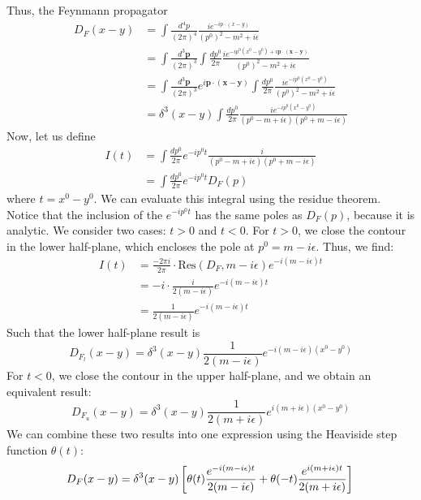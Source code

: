 \documentclass[12pt]{article}
\newcommand{\+}{\dagger}
\begin{document}
Thus, the Feynmann propagator
\begin{align*}
    D_F(x-y) &= \int \frac{d^4p}{(2\pi)^4} \frac{i e^{-ip\cdot(x-y)}}{(p^0)^2 - m^2
    + i\epsilon} \\
    &= \int \frac{d^3\mathbf{p}}{(2\pi)^3} \int \frac{dp^0}{2\pi} \frac{i
    e^{-ip^0(x^0 - y^0) + i\mathbf{p}\cdot(\mathbf{x}-\mathbf{y})}}{(p^0)^2 - m^2
    + i\epsilon} \\
    &= \int \frac{d^3\mathbf{p}}{(2\pi)^3}e^{i\mathbf{p}\cdot (\mathbf{x} - \mathbf{y})} \int \frac{dp^0}{2\pi} \frac{i
    e^{-ip^0(x^0 - y^0)}}{(p^0)^2 - m^2 + i\epsilon} \\
    &= \delta^3(x - y) \int \frac{dp^0}{2\pi} \frac{i
    e^{-ip^0(x^0 - y^0)}}{(p^0  - m + i\epsilon)(p^0 + m - i\epsilon)}
\end{align*}
Now, let us define 
\begin{align*}
    I(t) &= \int \frac{dp^0}{2\pi}e^{-ip^0 t} \frac{i}{(p^0  - m +
    i\epsilon)(p^0 + m - i\epsilon)}  \\
    &= \int \frac{dp^0}{2\pi} e^{-ip^0 t} D_F(p)
\end{align*}
where $t = x^0 - y^0$. We can evaluate this integral using the residue theorem.
Notice that the  inclusion of the $e^{-ip^0t}$ has  the same poles as
$D_F(p)$, because it is analytic. We consider two cases: $t>0$ and $t<0$. For
$t>0$, we close the contour in the lower half-plane, which encloses the pole at
$p^0 = m - i\epsilon$. Thus, we find:
\begin{align*}
    I(t) &= \frac{-2\pi i}{2\pi} \cdot \text{Res}(D_F, m - i\epsilon) e^{-i(m - i\epsilon)t} \\
    &= -i \cdot \frac{i}{2(m - i\epsilon)} e^{-i(m - i\epsilon)t} \\
    &= \frac{1}{2(m - i\epsilon)} e^{-i(m - i\epsilon)t}
\end{align*}
Such that the lower half-plane result is
\begin{equation*}
   D_{F_l}(x-y) = \delta^3(x-y) \frac{1}{2(m - i\epsilon)} e^{-i(m - i\epsilon)(x^0 - y^0)}
\end{equation*}
For $t<0$, we close the contour in the upper half-plane, and we obtain  an equivalent 
result:
\begin{equation*}
    D_{F_u}(x-y) = \delta^3(x-y) \frac{1}{2(m + i\epsilon)} e^{i(m + i\epsilon)(x^0 - y^0)}
\end{equation*}
We can combine these two results into one expression using the Heaviside step function
$\theta(t)$:
\begin{equation*}
    D_F(x-y) = \delta^3(x-y) \left[ \theta(t) \frac{e^{-i(m  - i\epsilon)t}}{2(m - i\epsilon)} 
    +  \theta(-t) \frac{e^{i(m + i\epsilon)t}}{2(m + i\epsilon)} \right] \\
\end{equation*}
\end{document}
